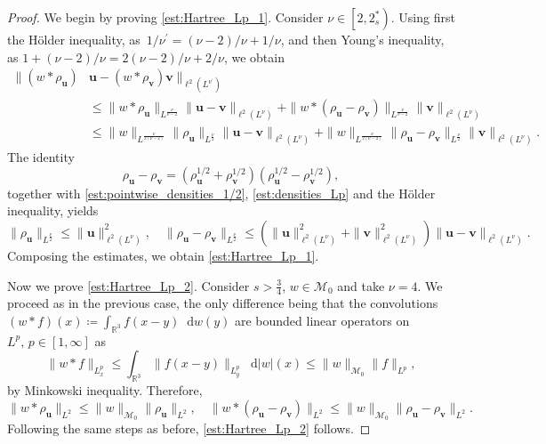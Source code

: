 \documentclass[12pt,a4paper]{amsart}
\numberwithin{equation}{section}
\newcommand{\ulu}{\boldsymbol{u}}
\newcommand{\ulv}{\boldsymbol{v}}
\newcommand*\diff{\mathop{}\!\mathrm{d}}
\newcommand{\twoasts}{{2^*_s}}
\begin{document}
	\begin{proof}
		We begin by proving \eqref{est:Hartree_Lp_1}. Consider $ \nu \in \left[ 2,  \twoasts  \right) $. Using first the H{\"o}lder inequality, as~$1/\nu^{\prime} = (\nu-2)/\nu + 1/\nu$, and then Young's inequality, as $ 1 + (\nu-2)/\nu = 2(\nu-2)/\nu + 2/\nu$, we obtain
		\begin{align*}
			\| (w \ast \rho_{\ulu}) &\ulu - (w \ast \rho_{\ulv})  \ulv \|_{\ell^2(L^{\nu^\prime})} \\
			& \leq \| w \ast \rho_{\ulu} \|_{L^{\frac{\nu}{\nu-2}}}  \| \ulu - \ulv \|_{\ell^2(L^{\nu})} + \| w \ast (\rho_{\ulu} - \rho_{\ulv}) \|_{L^{\frac{\nu}{\nu-2}}} \| \ulv \|_{\ell^2(L^{\nu})}  \\
			& \leq \| w \|_{L^{\frac{\nu}{2(\nu-2)}}} \| \rho_{\ulu} \|_{L^{\frac{\nu}{2}}} \| \ulu - \ulv \|_{\ell^2(L^{\nu})} + \| w \|_{L^{\frac{\nu}{2(\nu-2)}}} \| \rho_{\ulu} - \rho_{\ulv} \|_{L^{\frac{\nu}{2}}} \| \ulv \|_{\ell^2(L^{\nu})} .
		\end{align*}
		The identity 
		\begin{equation*}
			\rho_{\ulu} - \rho_{\ulv} = ( \rho_{\ulu}^{1/2} + \rho_{\ulv}^{1/2} ) ( \rho_{\ulu}^{1/2} - \rho_{\ulv}^{1/2} ), 
		\end{equation*}
		together with \eqref{est:pointwise_densities_1/2}, \eqref{est:densities_Lp} and the H{\"o}lder inequality, yields
		\begin{equation*}
			\| \rho_{\ulu} \|_{L^{\frac{\nu}{2}}} \leq \| \ulu  \|_{\ell^2(L^{\nu})}^2 , \quad \| \rho_{\ulu} - \rho_{\ulv} \|_{L^{\frac{\nu}{2}}} \leq (\| \ulu  \|_{\ell^2(L^{\nu})}^2 +\| \ulv \|_{\ell^2(L^{\nu})}^2  ) \| \ulu-\ulv \|_{\ell^2(L^{\nu})} .
		\end{equation*}
		Composing the estimates, we obtain \eqref{est:Hartree_Lp_1}.
		
		Now we prove \eqref{est:Hartree_Lp_2}. Consider $ s > \frac{3}{4} $, $ w \in \mathcal{M}_0 $ and take $\nu=4$. We proceed as in the previous case, the only difference being that the convolutions $ (w \ast f) (x) \coloneq \int_{\mathbb{R}^3} f (x-y) \diff w (y) $ are bounded linear operators on $L^p, \, p \in \left[1,\infty \right] $ as
		\begin{equation*}
			\| w \ast f \|_{L^p_x} \leq \int_{\mathbb{R}^3} \| f(x-y) \|_{L^p_y} \diff |w| (x) \leq \| w \|_{\mathcal{M}_0} \| f \|_{L^p},
		\end{equation*}
		by Minkowski inequality.
		Therefore,
		\begin{equation*}
			\| w \ast \rho_{\ulu} \|_{L^2} \leq \| w \|_{\mathcal{M}_0} \| \rho_{\ulu} \|_{L^2}, \quad \| w \ast (\rho_{\ulu} - \rho_{\ulv} ) \|_{L^2} \leq \| w \|_{\mathcal{M}_0} \| \rho_{\ulu} - \rho_{\ulv} \|_{L^2} .
		\end{equation*}
		Following the same steps as before, \eqref{est:Hartree_Lp_2} follows. 
	\end{proof}
	
\end{document}
